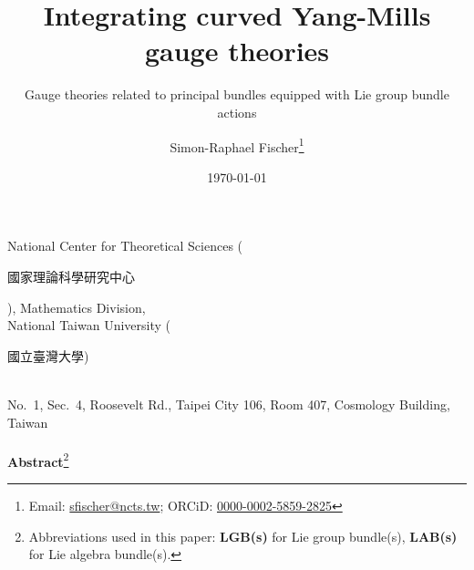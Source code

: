 \documentclass[a4paper,oneside,11pt,bibliography=totoc]{scrartcl}
\theoremstyle{plain}
\theoremstyle{remark}
\theoremstyle{definition}
\begin{document}
\renewcommand{\thefootnote}{\fnsymbol{footnote}}

\begin{titlepage}

\author{Simon-Raphael Fischer\footnote{Email: \href{mailto:sfischer@ncts.tw}{sfischer@ncts.tw}; ORCiD: \href{https://orcid.org/0000-0002-5859-2825}{0000-0002-5859-2825}} }
\title{Integrating curved Yang-Mills gauge theories} 
\subtitle{Gauge theories related to principal bundles equipped with Lie group bundle actions}
\date{\today} 
\maketitle
\thispagestyle{empty}

\begin{center}
National Center for Theoretical Sciences (\begin{CJK*}{UTF8}{bkai}國家理論科學研究中心\end{CJK*}),
Mathematics Division,
\\
National Taiwan University
(\begin{CJK*}{UTF8}{bkai}國立臺灣大學)\end{CJK*}
\\
No.\ 1, Sec.\ 4, Roosevelt Rd., Taipei City 106, Room 407, Cosmology Building, Taiwan
\ \\
\ \\
\textbf{Abstract}\footnote[2]{Abbreviations used in this paper: \textbf{LGB(s)} for Lie group bundle(s), \textbf{LAB(s)} for Lie algebra bundle(s).}
\begin{abstract}
  \small{
}
\end{abstract}
\end{center}
\end{titlepage}
\end{document}
